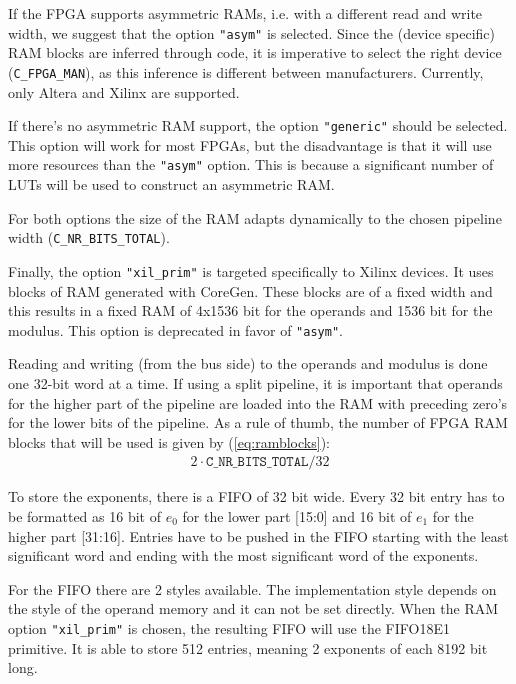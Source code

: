 If the FPGA supports asymmetric RAMs, i.e. with a different read and write width, we suggest that the option \verb|"asym"| is selected. Since the (device specific) RAM blocks are inferred through code, it is imperative to select the right device (\verb|C_FPGA_MAN|), as this inference is different between manufacturers. Currently, only Altera and Xilinx are supported.

If there's no asymmetric RAM support, the option \verb|"generic"| should be selected. This option will work for most FPGAs, but the disadvantage is that it will use more resources than the \verb|"asym"| option. This is because a significant number of LUTs will be used to construct an asymmetric RAM.

For both options the size of the RAM adapts dynamically to the chosen pipeline width (\verb|C_NR_BITS_TOTAL|).

Finally, the option \verb|"xil_prim"| is targeted specifically to Xilinx devices. It uses blocks of RAM generated with CoreGen. These blocks are of a fixed width and this results in a fixed RAM of 4x1536 bit for the operands and 1536 bit for the modulus. This option is deprecated in favor of \verb|"asym"|.

Reading and writing (from the bus side) to the operands and modulus is done one 32-bit word at a time. If using a split pipeline, it is important that operands for the higher part of the pipeline are loaded into the RAM with preceding zero's for the lower bits of the pipeline. As a rule of thumb, the number of FPGA RAM blocks that will be used is given by (\ref{eq:ramblocks}):
\begin{align}
	2 \cdot \mathtt{C\_NR\_BITS\_TOTAL} / 32\label{eq:ramblocks}
\end{align}
\newline

To store the exponents, there is a FIFO of 32 bit wide. Every 32 bit entry has to be formatted as 16 bit of $e_0$ for the
lower part [15:0] and 16 bit of $e_1$ for the higher part [31:16]. Entries have to be pushed in the FIFO starting with the least significant word and ending with the most significant word of the exponents.

For the FIFO there are 2 styles available. The implementation style depends on the style of the operand memory and it can not be set directly. When the RAM option \verb|"xil_prim"| is chosen, the resulting FIFO will use the FIFO18E1 primitive. It is able to store 512 entries, meaning 2 exponents of each 8192 bit long.

